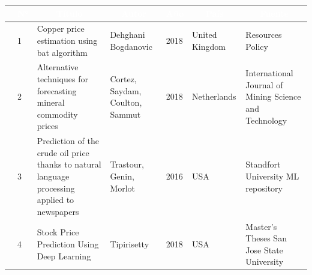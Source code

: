 \begin{table}[h]
	\newcommand{\multirot}[1]{\multirow{2}{*}[-8ex]{\rotcell{\rlap{#1}}}}
	\footnotesize
	\centering
	\begin{tabular}{|m{0.5cm}|m{0.3cm}|m{4cm}|m{2cm}|m{0.6cm}|m{1.7cm}|m{3cm}|} 
		\hline
		\rowcolor[rgb]{0,0.251,0.502} \multicolumn{1}{|c|}{\textcolor{white}{Tipo}} & \multicolumn{1}{c|}{\textcolor{white}{N°}} & \multicolumn{1}{c|}{\textcolor{white}{Título}}                                                                             & \multicolumn{1}{c|}{\textcolor{white}{Autor}}        & \multicolumn{1}{c|}{\textcolor{white}{Año}} & \multicolumn{1}{c|}{\textcolor{white}{País}} & \multicolumn{1}{c|}{\textcolor{white}{Fuente}}                                                        \\ 
		\hline
		\multirot{Problema}                                        & 1                                             & Copper price estimation using bat algorithm~                                                                               & Dehghani  Bogdanovic                                 & 2018                                        & United Kingdom                               & Resources Policy                                                                                      \\ 
		\cline{2-7}
		& 2                                             & Alternative techniques for forecasting mineral commodity prices                                                            & Cortez, Saydam, Coulton,  Sammut                     & 2018                                        & Netherlands                                  & International Journal of Mining Science and Technology                                                \\ 
		\hline
		\multirow{3}{*}[-14ex]{\rotcell{\rlap{Propuesta}}}
		& 3                                             & Prediction of the crude oil price thanks to natural language
		processing applied to newspapers~                           & Trastour, Genin,  Morlot                             & 2016                                        & USA                                          & Standfort University ML repository                                                                    \\ 
		\cline{2-7}
		& 4                                             & Stock Price Prediction Using Deep Learning~                                                                                & Tipirisetty                                          & 2018                                        & USA                                          & Master's Theses San Jose State University                                                             \\ 

\end{tabular}
\end{table}
